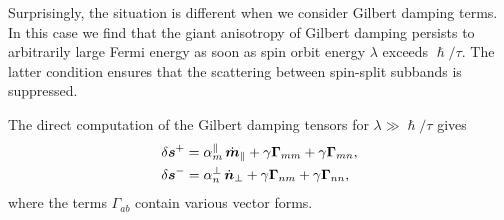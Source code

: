Surprisingly, the situation is different when we consider Gilbert damping terms. In this case we find that the giant anisotropy of Gilbert damping persists to arbitrarily large Fermi energy as soon as spin orbit energy $\lambda$ exceeds $\hslash/\tau$. The latter condition ensures that the scattering between spin-split subbands is suppressed. 

The direct computation of the Gilbert damping tensors for $\lambda\gg \hslash/\tau$ gives
\beml
\label{chap03:gilbert}
\begin{align}
&\delta\boldsymbol{s}^+= \alpha_m^\parallel\,\dot{\boldsymbol{m}}_\parallel + \gamma \boldsymbol{\Gamma}_{mm}+ \gamma\boldsymbol{\Gamma}_{mn},\\
&\delta\boldsymbol{s}^-= \alpha_n^\perp\,\dot{\boldsymbol{n}}_\perp +\gamma \boldsymbol{\Gamma}_{nm}+\gamma \boldsymbol{\Gamma}_{nn},
\end{align}
\eml
where the terms $\Gamma_{ab}$ contain various vector forms. 

